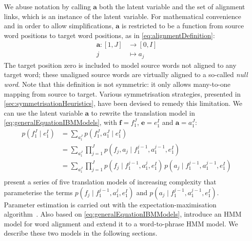 %
We abuse notation by calling $\bm{a}$ both the latent variable
and the set of alignment links, which is an instance of the latent
variable.
For mathematical convenience and in order to allow simplifications,
$\bm{a}$ is restricted to be a function from source word positions
to target word positions, as in \autoref{eq:alignmentDefinition}:
%
\begin{equation}
\begin{split}
  \bm{a} : [1, J] &\longrightarrow [0, I] \\
                j &\longmapsto a_j
\end{split}
\label{eq:alignmentDefinition}
\end{equation}
%
The target position zero is included to
model source words not aligned to any target word; these unaligned source words
are virtually aligned to a so-called \emph{null word}. Note that this definition
is not symmetric: it only allows many-to-one mapping from source to target.
Various symmetrisation strategies, presented in \autoref{sec:symmetrisationHeuristics},
have been devised to remedy this limitation. We can use the latent variable
$\bm{a}$ to rewrite the translation model in
\autoref{eq:generalEquationIBMModels}, with $\bm{f} = f_1^J$, $\bm{e} = e_1^I$
and $\bm{a} = a_1^J$:
%
\begin{equation}
  \begin{split}
    p(f_1^J \mid e_1^I) &= \sum_{a_1^J} p(f_1^J, a_1^J \mid e_1^I) \\
                        &= \sum_{a_1^J} \prod_{j = 1}^J p(f_j, a_j \mid f_1^{j - 1}, a_1^{j - 1}, e_1^I) \\
                        &= \sum_{a_1^J} \prod_{j = 1}^J p(f_j \mid f_1^{j - 1}, a_1^j, e_1^I) \, p(a_j \mid f_1^{j - 1}, a_1^{j - 1}, e_1^I) \\
  \end{split}
  \label{eq:generalEquationIBMModels}
\end{equation}
%
\citet{brown-dellapietra-dellapietra-mercer-1993} present a series
of five translation models of increasing complexity that parameterise the terms
$p(f_j \mid f_1^{j - 1}, a_1^j, e_1^I)$ and
$p(a_j \mid f_1^{j-1}, a_1^{j-1}, e_1^I)$.
Parameter estimation is carried out with the
expectation-maximisation algorithm~\citep{dempster-laird-rubin:1977:JRSS}.
Also based on \autoref{eq:generalEquationIBMModels}, \citet{vogel-ney-tillmann}
introduce an HMM model for word alignment and \citet{deng-and-byrne:2008:ASLP}
extend it to a word-to-phrase HMM model. We describe these two models in the following
sections.

